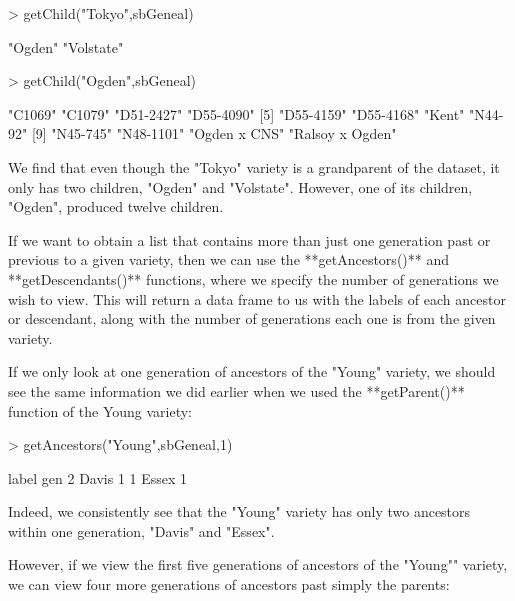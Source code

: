 \documentclass{article}
\numberwithin{equation}{section} %
\begin{document}
\begin{Schunk}
\begin{Sinput}
> getChild("Tokyo",sbGeneal)
\end{Sinput}
\begin{Soutput}
[1] "Ogden"    "Volstate"
\end{Soutput}
\begin{Sinput}
> getChild("Ogden",sbGeneal)
\end{Sinput}
\begin{Soutput}
 [1] "C1069"          "C1079"          "D51-2427"       "D55-4090"      
 [5] "D55-4159"       "D55-4168"       "Kent"           "N44-92"        
 [9] "N45-745"        "N48-1101"       "Ogden x CNS"    "Ralsoy x Ogden"
\end{Soutput}
\end{Schunk}

We find that even though the "Tokyo" variety is a grandparent of the dataset, it only has two children, "Ogden" and "Volstate". However, one of its children, "Ogden", produced twelve children.

If we want to obtain a list that contains more than just one generation past or previous to a given variety, then we can use the **getAncestors()** and **getDescendants()** functions, where we specify the number of generations we wish to view. This will return a data frame to us with the labels of each ancestor or descendant, along with the number of generations each one is from the given variety.

If we only look at one generation of ancestors of the "Young" variety, we should see the same information we did earlier when we used the **getParent()** function of the Young variety:

\begin{Schunk}
\begin{Sinput}
> getAncestors("Young",sbGeneal,1)
\end{Sinput}
\begin{Soutput}
  label gen
2 Davis   1
1 Essex   1
\end{Soutput}
\end{Schunk}

Indeed, we consistently see that the "Young" variety has only two ancestors within one generation, "Davis" and "Essex".

However, if we view the first five generations of ancestors of the "Young"" variety, we can view four more generations of ancestors past simply the parents:
\end{document}
